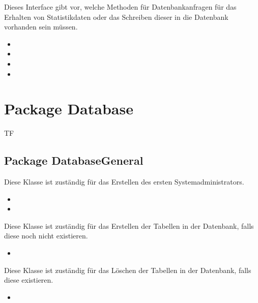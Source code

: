 			Dieses Interface gibt vor, welche Methoden für Datenbankanfragen für das Erhalten von Statistikdaten oder das Schreiben dieser in die Datenbank vorhanden sein müssen.
			\begin{itemize}
				\item {}
				\item {}
				\item {}
				\item {}
			\end{itemize}
		
	\section{Package Database}
	\begin{tiny}
		TF
	\end{tiny}
	\subsection{Package DatabaseGeneral}
	
		Diese Klasse ist zuständig für das Erstellen des ersten Systemadministrators.
		\begin{itemize}
			\item {}
			\item {}
		\end{itemize}
	
		Diese Klasse ist zuständig für das Erstellen der Tabellen in der Datenbank, falls diese noch nicht existieren.
		\begin{itemize}
			\item {}
		\end{itemize}
	
		Diese Klasse ist zuständig für das Löschen der Tabellen in der Datenbank, falls diese existieren.
		\begin{itemize}
			\item {}
		\end{itemize}
	
